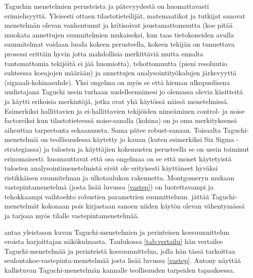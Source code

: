 \documentclass[12pt,a4paper,finnish]{tutthesis}
\begin{document}
Taguchin menetelmien perusteista ja pätevyydestä on huomattavasti erimielisyyttä.
Yleisesti ottaen tilastotieteilijät, matemaatikot ja tutkijat sanovat menetelmän
olevan vanhentunut ja kritisoivat joustamattomuutta (koe pitää muokata
annettujen suunnitelmien mukaiseksi, kun taas tietokoneiden avulla suunnitelmat
voidaan luoda kokeen perusteella,
kokeen tekijän on tunnettava prosessi erittäin hyvin
jotta mahdollisia merkittäviä mutta ennalta tuntemattomia tekijöitä
ei jää huomiotta), tehottomuutta (pieni resoluutio suhteessa
koeajojen määrään) ja annettujen analysointityökalujen järkevyyttä
(signaali-kohinasuhde).
Yksi ongelma on myös se että hieman ulkopuolisena uudistajana Taguchi
usein turhaan uudelleennimesi jo olemassa olevia käsitteitä ja käytti
erikoisia merkintöjä, jotka ovat yhä käytössä näissä menetelmissä.
Esimerkiksi hallittavien ja ei-hallittavien tekijöiden nimeäminen
control- ja noise factoreiksi kun tilastotieteessä noise-sanalla (kohina)
on jo oma merkityksensä aiheuttaa tarpeetonta sekaannusta.
Sama pätee robust-sanaan.
Toisaalta Taguchi-menetelmiä
on teollisuudessa käytetty jo kauan (kuten esimerkiksi Six Sigma -strategiassa)
ja tulosten ja käyttäjien kokemusten perusteella se on usein
toiminut erinomaisesti.
\textcite{Berube1998} huomauttavat että osa ongelmaa on se että
monet käytetyistä tulosten analysointimenetelmistä eivät ole
erityisesti käyttäneet hyväksi ristikkäisen suunnitelman ja ulkotaulukon
rakennetta.
Montgomeryn \parencite*[s.~554]{Montgomery2012} mukaan vastepintamenetelmä
(josta lisää luvussa \ref{vastep})
on luotettavampi ja tehokkaampi vaihtoehto robustien parametrien suunnitteluun.
\textcite{Sleeper2012} jättää Taguchi-menetelmät kokonaan
pois kirjastaan sanoen niiden käytön olevan vähentymässä ja tarjoaa myös tilalle
vastepintamenetelmää.

\textcite{Antony2006} antaa yleistason kuvan Taguchi-menetelmien ja
perinteisen koesuunnittelun eroista harjoittajan näkökulmasta. Taulukossa \ref{tab:vertailu}
hän vertailee Taguchi-menetelmää ja perinteistä koesuunnittelua, jolla hän
tässä tarkoittaa seulontakoe-vastepinta-menetelmää josta lisää luvussa \ref{vastep}.
Antony näyttää kallistuvan Taguchi-menetelmän kannalle teollisuuden
tarpeiden tapauksessa.
\end{document}
